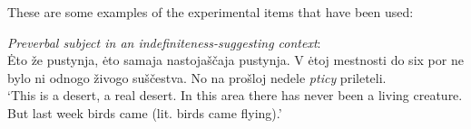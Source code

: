 \documentclass[output=paper,colorlinks,citecolor=brown]{langscibook}
\begin{document}


These are some examples of the experimental items that have been used: 

\ea \textit{Preverbal subject in an indefiniteness-suggesting context}: \\
\.{E}to \v{z}e pustynja, \.{e}to samaja nastoja\v{s}\v{c}aja pustynja. V \.{e}toj mestnosti do six por ne bylo ni odnogo \v{z}ivogo su\v{s}\v{c}estva. No na pro\v{s}loj nedele \textit{pticy} prileteli.\\
`This is a desert, a real desert. In this area there has never been a living creature. But last week birds came (lit. birds came flying).'
\z
\end{document}
